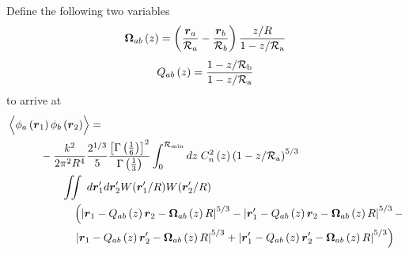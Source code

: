 Define the following two variables
\begin{equation}\label{Omega}
\boldsymbol{\Omega}_{ab}\left(z\right) = 
\left(\frac{\boldsymbol{r}_{a}}{\mathcal{R}_{a}} - \frac{\boldsymbol{r}_{b}}{\mathcal{R}_{b}} \right) \frac{z/R}{1-z/\mathcal{R}_{\rm a}}
\end{equation}
\begin{equation}\label{Q}
Q_{ab}\left(z\right) =  
\frac{1 - z/\mathcal{R}_{\rm b}}{1-z/\mathcal{R}_{\rm a}}
\end{equation}
to arrive at
\begin{equation}\label{prphase_n6}
\begin{aligned}
&\left\langle \vphantom{\hat{\phi}_{a}} \phi_{a}\left(\boldsymbol{r}_{1}\right) \phi_{b}\left(\boldsymbol{r}_{2}\right)\right\rangle = \\
&\quad\quad\quad
-\frac{k^{2}}{2\pi^{2}R^{4}} 
\frac{2^{1/3}}{5}\frac{\left[\Gamma\left(\frac{1}{6}\right)\right]^{2}}{\Gamma\left(\frac{1}{3}\right)} 
\int_{0}^{\mathcal{R}_{\rm min}} dz\;C_{n}^{2}\left(z\right) 
\left(1 - z/\mathcal{R}_{\rm a}\right)^{5/3}\\
&\quad\quad\quad\quad\quad
\iint \; d\boldsymbol{r}^{\prime}_{1}d\boldsymbol{r}^{\prime}_{2}  
W(\boldsymbol{r}^{\prime}_{1}/R) W(\boldsymbol{r}^{\prime}_{2}/R) \\
&\quad\quad\quad\quad\quad\quad
\left(\left\vert \boldsymbol{r}_{1}  - Q_{ab}\left(z\right)\boldsymbol{r}_{2} - \boldsymbol{\Omega}_{ab}\left(z\right)R\right\vert^{5/3} -
\left\vert \boldsymbol{r}^{\prime}_{1}  - Q_{ab}\left(z\right)\boldsymbol{r}_{2} - \boldsymbol{\Omega}_{ab}\left(z\right)R\right\vert^{5/3} -
\right. \\
& \quad\quad\quad\quad\quad\quad
\left.
\left\vert \boldsymbol{r}_{1}  - Q_{ab}\left(z\right)\boldsymbol{r}^{\prime}_{2} - \boldsymbol{\Omega}_{ab}\left(z\right)R\right\vert^{5/3} + 
\left\vert \boldsymbol{r}^{\prime}_{1}  - Q_{ab}\left(z\right)\boldsymbol{r}^{\prime}_{2} - \boldsymbol{\Omega}_{ab}\left(z\right)R\right\vert^{5/3}\right)
\end{aligned}
\end{equation}

